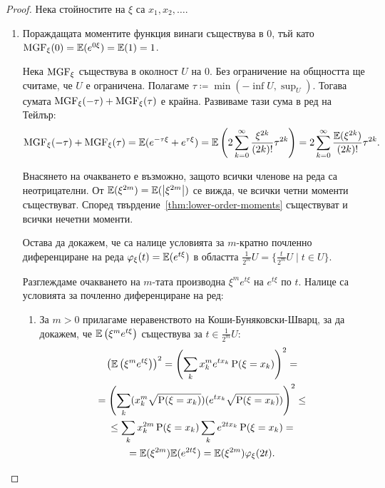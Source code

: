\documentclass[numbers=endperiod, DIV=15, bibliography=totocnumbered]{scrartcl}
\begin{document}
\begin{proof}
  Нека стойностите на $\xi$ са $x_1, x_2, \ldots$.

  \mbox{}
  \begin{enumerate}
    \item Пораждащата моментите функция винаги съществува в $0$, тъй като $\operatorname{MGF}_\xi(0) = \mathbb{E}(e^{0\xi}) = \mathbb{E}(1) = 1$.

    Нека $\operatorname{MGF}_\xi$ съществува в околност $U$ на $0$. Без ограничение на общността ще считаме, че $U$ е ограничена. Полагаме $\tau \coloneqq \min(-\inf U, \sup_U)$. Тогава сумата $\operatorname{MGF}_\xi(-\tau) + \operatorname{MGF}_\xi(\tau)$ е крайна. Развиваме тази сума в ред на Тейлър:
    \begin{displaymath}
      \operatorname{MGF}_\xi(-\tau) + \operatorname{MGF}_\xi(\tau)
      =
      \mathbb{E}(e^{-\tau\xi} + e^{\tau\xi})
      =
      \mathbb{E}\left( 2 \sum_{k=0}^\infty \frac {\xi^{2k}} {(2k)!} \tau^{2k} \right)
      =
      2 \sum_{k=0}^\infty \frac {\mathbb{E}(\xi^{2k})} {(2k)!} \tau^{2k}.
    \end{displaymath}

    Внасянето на очакването е възможно, защото всички членове на реда са неотрицателни. От $\mathbb{E}(\xi^{2m}) = \mathbb{E}(\left\vert \xi^{2m} \right\vert)$ се вижда, че всички четни моменти съществуват. Според твърдение~\ref{thm:lower-order-moments} съществуват и всички нечетни моменти.

    Остава да докажем, че са налице условията за $m$-кратно почленно диференциране на реда $\varphi_\xi(t) = \mathbb{E} (e^{t\xi})$ в областта $\frac 1 {2^m} U = \{ \frac t {2^m} U \mid t \in U \}$.

    Разглеждаме очакването на $m$-тата производна $\xi^m e^{t \xi}$ на $e^{t \xi}$ по $t$. Налице са условията за почленно диференциране на ред:
    \begin{enumerate}
      \item За $m > 0$ прилагаме неравенството на Коши-Буняковски-Шварц, за да докажем, че $\mathbb{E} \left( \xi^m e^{t \xi} \right)$ съществува за $t \in \frac 1 {2^m} U$:
      \begin{multline*}
        {\left(\mathbb{E}\left( \xi^m e^{t \xi} \right) \right)}^2
        =
        {\left(\sum_k x_k^m e^{t x_k} \operatorname{P}(\xi = x_k) \right)}^2
        = \\ =
        {\left(\sum_k (x_k^m \sqrt{\operatorname{P}(\xi = x_k)}) (e^{t x_k} \sqrt{\operatorname{P}(\xi = x_k)}) \right)}^2
        \leq \\ \leq
        \sum_k x_k^{2m} \operatorname{P}(\xi = x_k)
        \sum_k e^{2t x_k} \operatorname{P}(\xi = x_k)
        = \\ =
        \mathbb{E}(\xi^{2m})
        \mathbb{E}(e^{2t \xi})
        =
        \mathbb{E}(\xi^{2m})
        \varphi_\xi(2t).
      \end{multline*}


\end{enumerate}
\end{enumerate}
\end{proof}
\end{document}
